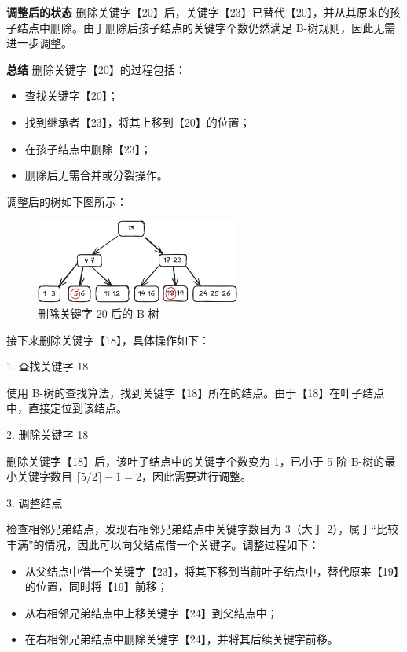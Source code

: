 \documentclass[lang=cn,newtx,10pt,scheme=chinese]{../elegantbook}
\begin{document}
     
     \textbf{调整后的状态}  
     删除关键字【20】后，关键字【23】已替代【20】，并从其原来的孩子结点中删除。由于删除后孩子结点的关键字个数仍然满足 B-树规则，因此无需进一步调整。
     
     
     \textbf{总结}  
     删除关键字【20】的过程包括：
     \begin{itemize}
       \item 查找关键字【20】；
       \item 找到继承者【23】，将其上移到【20】的位置；
       \item 在孩子结点中删除【23】；
       \item 删除后无需合并或分裂操作。
     \end{itemize}

     调整后的树如下图所示：
     \begin{figure}[!htbp]
        
          \centering
          \includegraphics[width=0.6\textwidth]{./figure/pdf/cropped/Btree_del3.pdf}
          \caption{删除关键字 20 后的 B-树}
          \label{fig:Btree_delete_20}
     \end{figure}

     接下来删除关键字【18】，具体操作如下：

     1. 查找关键字 18  

        使用 B-树的查找算法，找到关键字【18】所在的结点。由于【18】在叶子结点中，直接定位到该结点。
     
     2. 删除关键字 18  

        删除关键字【18】后，该叶子结点中的关键字个数变为 1，已小于 5 阶 B-树的最小关键字数目 $\lceil 5/2 \rceil - 1 = 2$，因此需要进行调整。
     
     3. 调整结点  

        检查相邻兄弟结点，发现右相邻兄弟结点中关键字数目为 3（大于 2），属于“比较丰满”的情况，因此可以向父结点借一个关键字。调整过程如下：
        \begin{itemize}
          \item 从父结点中借一个关键字【23】，将其下移到当前叶子结点中，替代原来【19】的位置，同时将【19】前移；
          \item 从右相邻兄弟结点中上移关键字【24】到父结点中；
          \item 在右相邻兄弟结点中删除关键字【24】，并将其后续关键字前移。
        \end{itemize}
     
\end{document}
